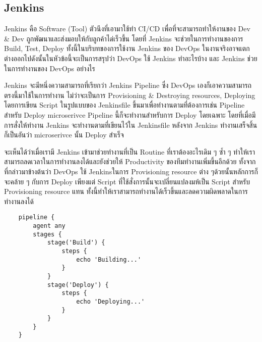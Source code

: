 \subsection{Jenkins}
Jenkins คือ Software (Tool) ตัวนึงที่เอามาใช้ทำ CI/CD \cite{cicd} เพื่อที่จะสามารถทำให้งานของ Dev \& Dev
ถูกพัฒนาและส่งมอบให้กับลูกค้าได่เร็วขึ้น โดยที่ Jenkins จะช่วยในการทำงานของการ Build, Test, Deploy
ทั้งนี้ในบริบทของการใช้งาน Jenkins ของ DevOps ในงานจริงอาจแตกต่างออกไปดังนั้นในหัวข้อนี้จะเป็นการสรุปว่า
DevOps ใช้ Jenkins ทำอะไรบ้าง และ Jenkins ช่วยในการทำงานของ DevOps อย่างไร

Jenkins จะมีหนึ่งความสามารถที่เรียกว่า Jenkins Pipeline ซึ่ง DevOps เองก็เอาความสามารถตรงนี้มาใช้ในการทำงาน
ไม่ว่าจะเป็นการ Provisioning \& Destroying resources, Deploying โดยการเขียน Script ในรูปแบบของ Jenkinsfile
ขึ้นมาเพื่อทำงานตามที่ต้องการเช่น Pipeline สำหรับ Deploy microserivce Pipeline นี้ก็จะทำงานสำหรับการ Deploy โดยเฉพาะ
โดยที่เมื่อมีการสั่งให้ทำงาน Jenkins จะทำงานตามที่เขียนไว้ใน Jenkinsfile หลังจาก Jenkins ทำงานเสร็จสิ้นก็เป็นอันว่า microserivce นั้น Deploy สำเร็จ

จะเห็นได้ว่าเมื่อเรามี Jenkins เข้ามาช่วยทำงานที่เป็น Routine ที่เราต้องอะไรเดิม ๆ ซ้ำ ๆ ทำให้เราสามารถลดเวลาในการทำงานลงได้และยังช่วยให้
Productivity ของทีมทำงานเพิ่มขึ้นอีกด้วย ทั้งจากที่กล่าวมาข้างต้นว่า DevOps ใช้ Jenkinsในการ Provisioning resource ต่าง ๆด้วยนั้นหลักการก็จะคล้าย ๆ กับการ Deploy
เพียงแต่ Script ที่ใช้สั่งการนั้นจะเปลี่ยนแปลงมห้เป็น Script สำหรับ Provisioning resource แทน ทั้งนี้ทำให้เราสามารถทำงานได้เร็วขึ้นและลดความผิดพลาดในการทำงานลงได้

\begin{verbatim}
    pipeline {
        agent any
        stages {
            stage('Build') {
                steps {
                    echo 'Building...'
                }
            }
            stage('Deploy') {
                steps {
                    echo 'Deploying...'
                }
            }
        }
    }
\end{verbatim}
